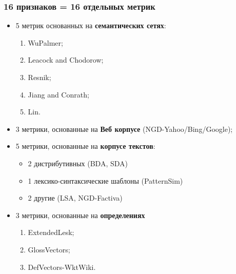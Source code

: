 






\begin{frame}
\frametitle{16 признаков = 16 отдельных метрик}

    \begin{itemize}
    
    \item 5 метрик основанных на \textbf{семантических сетях}:
    \begin{enumerate}
      \item WuPalmer;
      \item Leacock and Chodorow;
      \item Resnik;
      \item Jiang and Conrath;
      \item Lin.
    \end{enumerate} 
    \item 3 метрики, основанные на \textbf{Веб корпусе} (NGD-Yahoo/Bing/Google);
        
    \item 5 метрики, основанные на \textbf{корпусе текстов}: 
    \begin{itemize}
      \item 2 дистрибутивных (BDA, SDA)
      \item 1 лексико-синтаксические шаблоны (PatternSim)
      \item 2 другие (LSA, NGD-Factiva)
    \end{itemize}
    
    \item 3 метрики, основанные на \textbf{определениях} 
    \begin{enumerate}
      \item ExtendedLesk;
      \item GlossVectors;
      \item DefVectors-WktWiki.
    \end{enumerate}
     
\end{itemize}

\end{frame}







